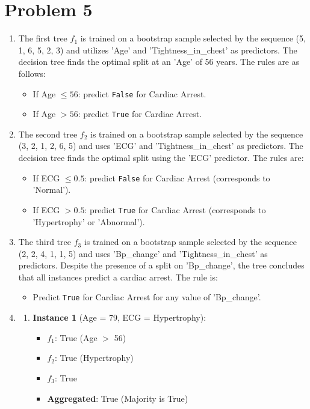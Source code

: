 \documentclass{article}
\begin{document}
\section*{Problem 5}
\begin{enumerate}
    \item 
    The first tree \( f_1 \) is trained on a bootstrap sample selected by the sequence (5, 1, 6, 5, 2, 3) and utilizes 'Age' and 'Tightness\_in\_chest' as predictors. The decision tree finds the optimal split at an 'Age' of 56 years. The rules are as follows:
\begin{itemize}
    \item If Age \( \leq 56 \): predict \texttt{False} for Cardiac Arrest.
    \item If Age \( > 56 \): predict \texttt{True} for Cardiac Arrest.
\end{itemize}

    \item 
The second tree \( f_2 \) is trained on a bootstrap sample selected by the sequence (3, 2, 1, 2, 6, 5) and uses 'ECG' and 'Tightness\_in\_chest' as predictors. The decision tree finds the optimal split using the 'ECG' predictor. The rules are:
\begin{itemize}
    \item If ECG \( \leq 0.5 \): predict \texttt{False} for Cardiac Arrest (corresponds to 'Normal').
    \item If ECG \( > 0.5 \): predict \texttt{True} for Cardiac Arrest (corresponds to 'Hypertrophy' or 'Abnormal').
\end{itemize}

    \item 
    The third tree \( f_3 \) is trained on a bootstrap sample selected by the sequence (2, 2, 4, 1, 1, 5) and uses 'Bp\_change' and 'Tightness\_in\_chest' as predictors. Despite the presence of a split on 'Bp\_change', the tree concludes that all instances predict a cardiac arrest. The rule is:
\begin{itemize}
    \item Predict \texttt{True} for Cardiac Arrest for any value of 'Bp\_change'.
\end{itemize}

    \item 
    \begin{enumerate}
    \item \textbf{Instance 1} (Age = 79, ECG = Hypertrophy):
    \begin{itemize}
        \item $f_1$: True (Age $>$ 56)
        \item $f_2$: True (Hypertrophy)
        \item $f_3$: True
        \item \textbf{Aggregated}: True (Majority is True)
    \end{itemize}


\end{enumerate}
\end{enumerate}
\end{document}
